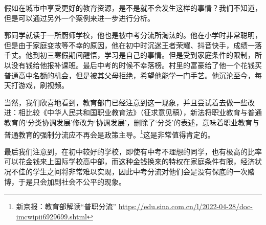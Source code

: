 \documentclass[12pt,UTF8]{ctexart}
\begin{document}
\par{假如在城市中享受更好的教育资源，是不是就不会发生这样的事情？我们不知道，但是可以通过另外一个案例来进一步进行分析。}
\par{郭同学就读于一所厨师学校，他也是被中考分流所淘汰的。他在小学时非常聪明，但是由于家庭变故等不幸的原因，他在初中时沉迷王者荣耀、抖音快手，成绩一落千丈。他到初三寒假期间醒悟，学习是自己的事情。但是受到家庭条件的限制，所以没有钱给他报补课班。最后中考的时候不幸落榜。村里的富豪给了他一个花钱买普通高中名额的机会，但是被其父母拒绝，希望他能学一门手艺。他沉沦至今，每天打游戏，刷视频。}
\par{当然，我们欣喜地看到，教育部门已经注意到这一现象，并且尝试着去做一些改进：相比较《中华人民共和国职业教育法》（征求意见稿），新法将职业教育与普通教育的‘分类协调发展’修改为‘协调发展’，删除了‘分类’的表述，意味着职业教育与普通教育的强制分流应不再会是政策主导。\footnote{新京报：教育部解读“普职分流”
		\url{https://edu.sina.com.cn/l/2022-04-28/doc-imcwipii6929699.shtml}}这是非常值得肯定的。}
\par{最后我们注意到，在初中较好的学校，即使有中考不理想的同学，也有极高的比率可以花金钱来上国际学校高中部，而这种金钱换来的特权在家庭条件有限，经济状况不佳的学生之间将非常难以实现，因此中考分流对他们会是没有保底的一次赌博，于是只会加剧社会不公平的现象。}
\end{document}
